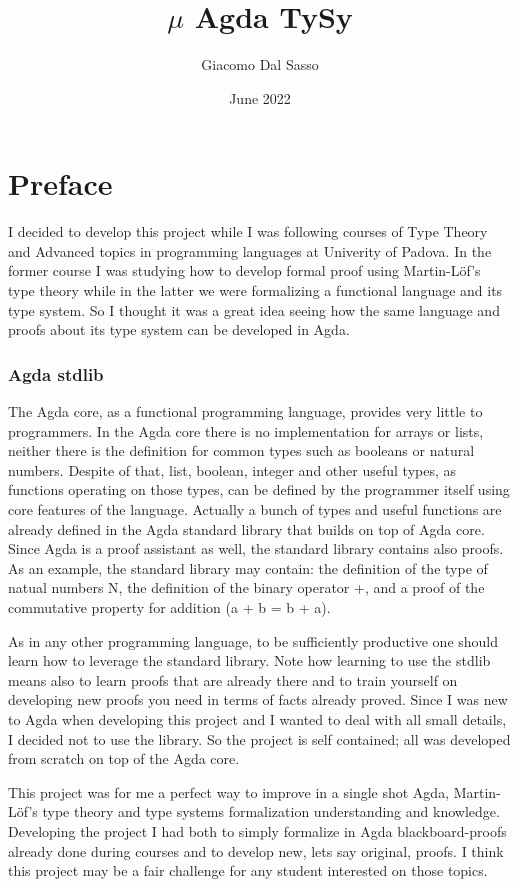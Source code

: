 \documentclass{article}
\title{$\mu$ Agda TySy}
\author{Giacomo Dal Sasso}
\date{June 2022}
\begin{document}
\maketitle


\section{Preface}

I decided to develop this project while I was following courses of Type Theory and Advanced topics in programming languages at Univerity of Padova.
In the former course I was studying how to develop formal proof using Martin-Löf's type theory while in the latter we were formalizing a functional language and its type system.
So I thought it was a great idea seeing how the same language and proofs about its type system can be developed in Agda.


\subsubsection*{Agda stdlib}
The Agda core, as a functional programming language, provides very little to programmers.
In the Agda core there is no implementation for arrays or lists, neither there is the definition for common types such as booleans or natural numbers.
Despite of that, list, boolean, integer and other useful types, as functions operating on those types, can be defined by the programmer itself using core features of the language.
Actually a bunch of types and useful functions are already defined in the Agda standard library that builds on top of Agda core.
Since Agda is a proof assistant as well, the standard library contains also proofs.
As an example, the standard library may contain: the definition of the type of natual numbers N, the definition of the binary operator +, and a proof of the commutative property for addition (a + b = b + a).

As in any other programming language, to be sufficiently productive one should learn how to leverage the standard library.
Note how learning to use the stdlib means also to learn proofs that are already there and to train yourself on developing new proofs you need in terms of facts already proved.
Since I was new to Agda when developing this project and I wanted to deal with all small details, I decided not to use the library.
So the project is self contained; all was developed from scratch on top of the Agda core.

\vspace{1em}
This project was for me a perfect way to improve in a single shot Agda, Martin-Löf's type theory and type systems formalization understanding and knowledge.
Developing the project I had both to simply formalize in Agda blackboard-proofs already done during courses and to develop new, lets say original, proofs.
I think this project may be a fair challenge for any student interested on those topics.
\end{document}
